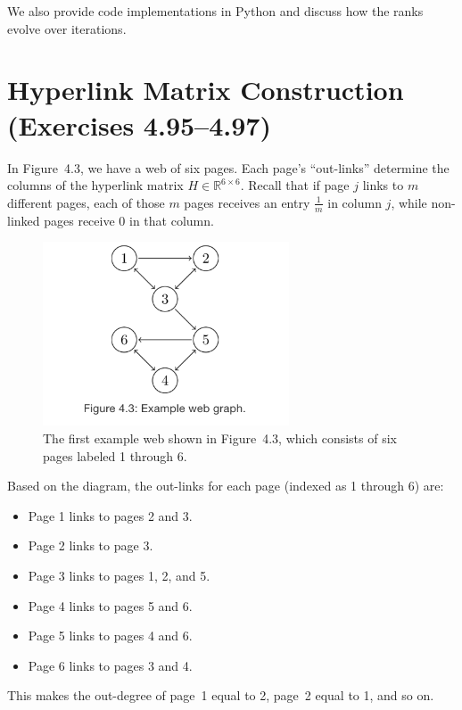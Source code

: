 \documentclass{article}
\begin{document}
We also provide code implementations in Python and discuss how the ranks evolve over iterations.

\section{Hyperlink Matrix Construction (Exercises 4.95--4.97)}

In Figure~4.3, we have a web of six pages. Each page's ``out-links'' determine the columns of the hyperlink matrix 
$H \in \mathbb{R}^{6 \times 6}$. Recall that if page $j$ links to $m$ different pages, each of those $m$ pages 
receives an entry $\tfrac{1}{m}$ in column $j$, while non-linked pages receive $0$ in that column.

\begin{figure}[h]
  \centering
  \includegraphics[width=0.65\textwidth]{img/Node_Tree_4.3.png}
  \caption{%
    The first example web shown in Figure~4.3, which consists of six pages labeled 1 through 6.
  }
  \label{fig:Node_Tree_4.3}
\end{figure}

Based on the diagram, the out-links for each page (indexed as 1 through 6) are:
\begin{itemize}
  \item Page 1 links to pages 2 and 3.
  \item Page 2 links to page 3.
  \item Page 3 links to pages 1, 2, and 5.
  \item Page 4 links to pages 5 and 6.
  \item Page 5 links to pages 4 and 6.
  \item Page 6 links to pages 3 and 4.
\end{itemize}
This makes the out-degree of page~1 equal to 2, page~2 equal to 1, and so on.
\end{document}
